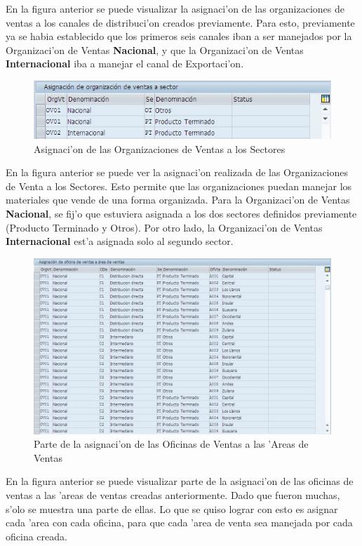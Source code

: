 	En la figura anterior se puede visualizar la asignaci'on de las organizaciones de ventas a los canales de distribuci'on creados previamente. Para esto, previamente ya se habia establecido que los primeros seis canales iban a ser manejados por la Organizaci'on de Ventas \textbf{Nacional}, y que la Organizaci'on de Ventas \textbf{Internacional} iba a manejar el canal de Exportaci'on. 
\begin{figure}[H]
\centering
\includegraphics[scale=0.65,type=jpg,ext=.jpg,read=.jpg]{figures/OrgVentasSector}
\caption{Asignaci'on de las Organizaciones de Ventas a los Sectores}
\label{fig:asigna3}
\end{figure}
	En la figura anterior se puede ver la asignaci'on realizada de las Organizaciones de Venta a los Sectores. Esto permite que las organizaciones puedan manejar los materiales que vende de una forma organizada. Para la Organizaci'on de Ventas \textbf{Nacional}, se fij'o que estuviera asignada a los dos sectores definidos previamente (Producto Terminado y Otros). Por otro lado, la Organizaci'on de Ventas \textbf{Internacional} est'a asignada solo al segundo sector.
\begin{figure}[H]
\centering
\includegraphics[scale=0.65,type=jpg,ext=.jpg,read=.jpg]{figures/OfVentaAreas}
\caption{Parte de la asignaci'on de las Oficinas de Ventas a las 'Areas de Ventas}
\label{fig:asigna4}
\end{figure}
	En la figura anterior se puede visualizar parte de la asignaci'on de las oficinas de ventas a las 'areas de ventas creadas anteriormente. Dado que fueron muchas, s'olo se muestra una parte de ellas. Lo que se quiso lograr con esto es asignar cada 'area con cada oficina, para que cada 'area de venta sea manejada por cada oficina creada.
